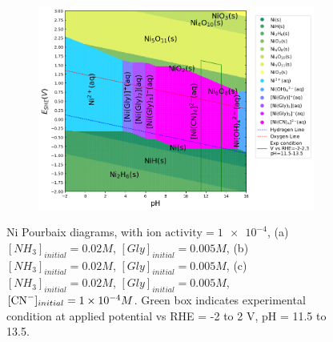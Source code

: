 \documentclass[journal=jacsat,manuscript=article]{achemso}
\begin{document}
\begin{figure}[htbp]
\begin{subfigure}[b]{0.3\textwidth}
        \par\medskip
    \end{subfigure}
    \begin{subfigure}[b]{0.3\textwidth}
        \subcaption{}\label{fig:Ni_Pourbaix_NH3_Gly_CN}
        \includegraphics[width=\textwidth]{Figures/pourbaix_diagrams/Ni-NH3-H2O_activity=1e-04_[NH3]=0.02M_[Gly]=0.005M_[CN]=0.0001.png}
        \par\medskip   
    \end{subfigure}

    \caption{Ni Pourbaix diagrams, with $\text{ion activity}=\num{1e-4}$, (a)$[NH_3]_{initial}= 0.02M$, $[Gly]_{initial}=0.005M$, (b)$[NH_3]_{initial}= 0.02M$, $[Gly]_{initial}=0.005M$, (c)$[NH_3]_{initial}= 0.02M$, $[Gly]_{initial}=0.005M$, $[\ce{CN-}]_{initial}=\num{1e-4}M$. Green box indicates experimental condition at applied potential vs RHE = -2 to 2 V, pH = 11.5 to 13.5.}
    \label{fig:Ni_Pourbaix}
\end{figure}
\end{document}

